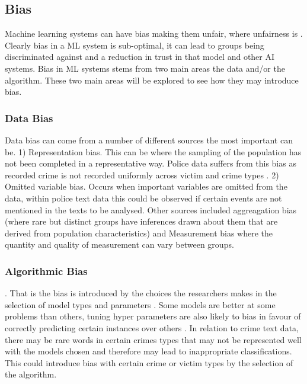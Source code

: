 \subsection{Bias} Machine learning systems can have bias making them unfair, where unfairness is  \parencite{mehrabi2021survey}. Clearly bias in a ML system is sub-optimal, it can lead to groups being discriminated against and a reduction in trust in that model and other AI systems.  Bias in ML systems stems from two main areas the data and/or the algorithm. These two main areas will be explored to see how they may introduce bias.

\subsubsection{Data Bias} Data bias can come from a number of different sources the most important can be. 1) Representation bias. This can be where the sampling of the population has not been completed in a representative way. Police data suffers from this bias as recorded crime is not recorded uniformly across victim and crime types \parencite{baumer2002neighborhood, tarling2010reporting }. 2) Omitted variable bias. Occurs when important  variables are omitted from the data, within police text data this could be observed if certain events are not mentioned in the texts to be analysed.  Other sources included aggreagation bias (where rare but distinct groups have inferences drawn about them that are derived from population characteristics) and Measurement bias where the quantity and quality of measurement can vary between groups.

\subsubsection{Algorithmic Bias}  \parencite{mehrabi2021survey}. That is the bias is introduced by the choices the researchers makes in the selection of model types and parameters \parencite{hooker2021moving}. Some models are better at some problems than others, tuning hyper parameters are also likely to bias in favour of correctly predicting certain instances over others \parencite{paiva2022relating}. In relation to crime text data, there may be rare words in certain crimes types that may not be represented well with the models chosen and therefore may lead to inappropriate classifications. This could introduce bias with certain crime or victim types by the selection of the algorithm. 


